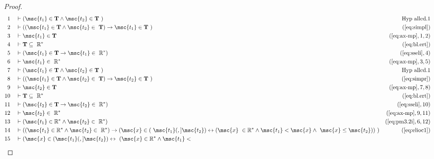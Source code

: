 \begin{proof}
\begin{align}
  1 &&  & \vdash ( \msc{t_1} \in \mathbf{T} \wedge \msc{t_2} \in \mathbf{T}
     ~)&\text{Hyp~allcd.1}\notag%
  \\ 2 &&  & \vdash ( ( \msc{t_1} \in \mathbf{T} \wedge \msc{t_2} \in
     ~\mathbf{T} ) \rightarrow \msc{t_1} \in \mathbf{T}
     ~)&(\mbox{\ref{eq:simpl}})\notag
  \\ 3 &&  & \vdash \msc{t_1} \in \mathbf{T}&(\mbox{\ref{eq:ax-mp}},1,2)\notag
  \\ 4 &&  & \vdash \mathbf{T} \subseteq
     ~\mathbb{R}^{*}&(\mbox{\ref{eq:bl.ert}})\notag
  \\ 5 &&  & \vdash ( \msc{t_1} \in \mathbf{T} \rightarrow \msc{t_1} \in
     ~\mathbb{R}^{*} )&(\mbox{\ref{eq:sseli}},4)\notag
  \\ 6 &&  & \vdash \msc{t_1} \in
     ~\mathbb{R}^{*}&(\mbox{\ref{eq:ax-mp}},3,5)\notag
  \\ 7 &&  & \vdash ( \msc{t_1} \in \mathbf{T} \wedge \msc{t_2} \in \mathbf{T}
     ~)&\text{Hyp~allcd.1}\notag%
  \\ 8 &&  & \vdash ( ( \msc{t_1} \in \mathbf{T} \wedge \msc{t_2} \in
     ~\mathbf{T} ) \rightarrow \msc{t_2} \in \mathbf{T}
     ~)&(\mbox{\ref{eq:simpr}})\notag
  \\ 9 &&  & \vdash \msc{t_2} \in \mathbf{T}&(\mbox{\ref{eq:ax-mp}},7,8)\notag
  \\ 10 &&  & \vdash \mathbf{T} \subseteq
     ~\mathbb{R}^{*}&(\mbox{\ref{eq:bl.ert}})\notag
  \\ 11 &&  & \vdash ( \msc{t_2} \in \mathbf{T} \rightarrow \msc{t_2} \in
     ~\mathbb{R}^{*} )&(\mbox{\ref{eq:sseli}},10)\notag
  \\ 12 &&  & \vdash \msc{t_2} \in
     ~\mathbb{R}^{*}&(\mbox{\ref{eq:ax-mp}},9,11)\notag
  \\ 13 &&  & \vdash ( \msc{t_1} \in \mathbb{R}^{*} \wedge \msc{t_2} \in
     ~\mathbb{R}^{*} )&(\mbox{\ref{eq:pm3.2i}},6,12)\notag
  \\ 14 &&  & \vdash ( ( \msc{t_1} \in \mathbb{R}^{*} \wedge \msc{t_2} \in
     ~\mathbb{R}^{*} ) \rightarrow ( \msc{x} \in (
     ~\msc{t_1} (,] \msc{t_2} ) \leftrightarrow ( \msc{x}
     ~\in \mathbb{R}^{*} \wedge \msc{t_1} < \msc{x} \wedge
     ~\msc{x} \le \msc{t_2} ) )
     ~)&(\mbox{\ref{eq:elioc1}})\notag
  \\ 15 &&  & \vdash ( \msc{x} \in ( \msc{t_1} (,] \msc{t_2} ) \leftrightarrow
     ~( \msc{x} \in \mathbb{R}^{*} \wedge \msc{t_1} <

\end{align}
\end{proof}

